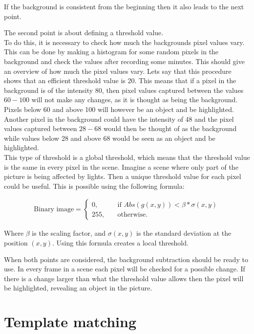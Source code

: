 If the background is consistent from the beginning then it also leads to the next point. 

The second point is about defining a threshold value. \\
To do this, it is necessary to check how much the backgrounds pixel values vary. This can be done by making a histogram for some random pixels in the background and check the values after recording some minutes. This should give an overview of how much the pixel values vary. Lets say that this procedure shows that an efficient threshold value is 20. This means that if a pixel in the background is of the intensity 80, then pixel values captured between the values $60-100$ will not make any changes, as it is thought as being the background. Pixels below 60 and above 100 will however be an object and be highlighted.
Another pixel in the background could have the intensity of 48 and the pixel values captured between $28-68$ would then be thought of as the background while values below 28 and above 68 would be seen as an object and be highlighted. \\
This type of threshold is a global threshold, which means that the threshold value is the same in every pixel in the scene. Imagine a scene where only part of the picture is being affected by lights. Then a unique threshold value for each pixel could be useful. This is possible using the following formula:

\begin{equation}
	\begin{aligned}
  		\ \text{Binary image} = \left\{ \begin{array}{ll}
         0, \quad &\text{if } Abs(g(x,y))<\beta * \sigma(x,y)\\
        255, \quad &\text{otherwise}.
        \end{array} \right . \ 
 	\end{aligned}
\end{equation} 

Where $\beta$ is the scaling factor, and $\sigma(x,y)$ is the standard deviation at the position $(x,y)$. Using this formula creates a local threshold.

When both points are considered, the background subtraction should be ready to use. In every frame in a scene each pixel will be checked for a possible change. If there is a change larger than what the threshold value allows then the pixel will be highlighted, revealing an object in the picture.
\section{Template matching}
